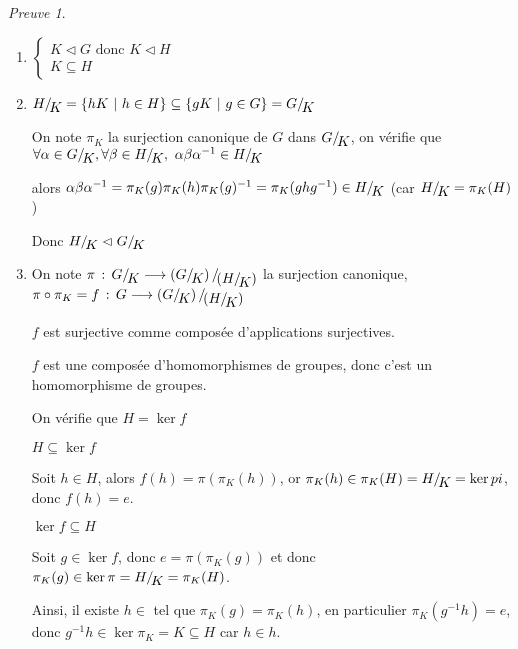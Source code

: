 \documentclass[]{article}
\theoremstyle{remark}
\newtheorem{myproof}{Preuve}
\theoremstyle{definition}
\newcommand{\funcshort}[3]{
#1 \, : \, #2 \longrightarrow #3
}
\newenvironment{proofpart}[1]{
	\noindent
	{\textbf{\boldmath #1}}
}{
	\checkmark
}
\newcommand*{\ClGa}[2]%
{\ensuremath{%
    #1/\!\raisebox{-.65ex}{\ensuremath{#2}}}}
\begin{document}
\begin{myproof}
	\leavevmode
	\begin{enumerate}
		\item $\left\{
		\begin{array}{l}
			K \vartriangleleft G \text{ donc } K \vartriangleleft H \\
			K \subseteq H
		\end{array}
		\right.$
		
		\item $\ClGa{H}{K} = \{hK ~ | ~ h \in H\} \subseteq \{gK ~ | ~ g \in G\} = \ClGa{G}{K}$
		
		On note $\pi_K$ la surjection canonique de $G$ dans $\ClGa{G}{K}$, on vérifie que $\forall \alpha \in \ClGa{G}{K}, \forall \beta \in \ClGa{H}{K}, ~ \alpha \beta \alpha^{-1} \in \ClGa{H}{K}$
		
		alors $\alpha \beta \alpha^{-1} = \pi_K(g) \pi_K(h) \pi_K(g)^{-1} = \pi_K(ghg^{-1}) \in \ClGa{H}{K}$ (car $\ClGa{H}{K} = \pi_K(H)$)
		
		Donc $\ClGa{H}{K} \vartriangleleft \ClGa{G}{K}$
		
		\item On note $\funcshort{\pi}{\ClGa{G}{K}}{\ClGa{\left(\ClGa{G}{K}\right)}{\left(\ClGa{H}{K}\right)}}$ la surjection canonique, $\pi \circ \pi_K=\funcshort{f}{G}{\ClGa{\left(\ClGa{G}{K}\right)}{\left(\ClGa{H}{K}\right)}}$
		
		$f$ est surjective comme composée d'applications surjectives.
		
		$f$ est une composée d'homomorphismes de groupes, donc c'est un homomorphisme de groupes.
		
		On vérifie que $H=\ker f$
		
		\begin{proofpart}{$H \subseteq \ker f$}
			Soit $h \in H$, alors $f(h)=\pi(\pi_K(h))$, or $\pi_K(h) \in \pi_K(H) = \ClGa{H}{K} = \ker pi$, donc $f(h) = e$.
		\end{proofpart}
		
		\begin{proofpart}{$\ker f \subseteq H$}
			Soit $g \in \ker f$, donc $e = \pi(\pi_K(g))$ et donc $\pi_K(g) \in \ker \pi = \ClGa{H}{K} = \pi_K(H)$.
			
			Ainsi, il existe $h \in $ tel que $\pi_K(g) = \pi_K(h)$, en particulier $\pi_K(g^{-1}h)=e$, donc $g^{-1}h \in \ker \pi_K = K \subseteq H$ car $h \in h$.
		\end{proofpart}
	\end{enumerate}
\end{myproof}
\end{document}
